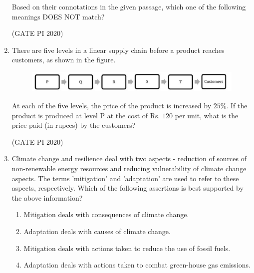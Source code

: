 \documentclass[journal,12pt,onecolumn]{IEEEtran}
\theoremstyle{remark}
\begin{document}
\begin{enumerate}
Based on their connotations in the given passage, which one of the following meanings DOES NOT match?
\begin{enumerate}
\end{enumerate}

\hfill (GATE PI 2020)

\item
There are five levels  in a linear supply chain before a product reaches customers, as shown in the figure.


\begin{figure}[h]
    \centering
    \includegraphics[width=0.5\columnwidth]{figs/fig1.png}
    \caption{}
    \label{fig:placeholder}
\end{figure} 



At each of the five levels, the price of the product is increased by $25\%$. If the product is produced at level P at the cost of Rs. $120$ per unit, what is the price paid (in rupees) by the customers?
\begin{enumerate}
\end{enumerate}

\hfill (GATE PI 2020)

\item Climate change and resilience deal with two aspects \-- reduction of sources of non-renewable energy resources and reducing vulnerability of climate change aspects. The terms 'mitigation' and 'adaptation' are used to refer to these aspects, respectively.
Which of the following assertions is best supported by the above information?
\begin{enumerate}
    \item Mitigation deals with consequences of climate change.
    \item Adaptation deals with causes of climate change.
    \item Mitigation deals with actions taken to reduce the use of fossil fuels.
    \item Adaptation deals with actions taken to combat green-house gas emissions.
\end{enumerate}


\end{enumerate}
\end{document}

